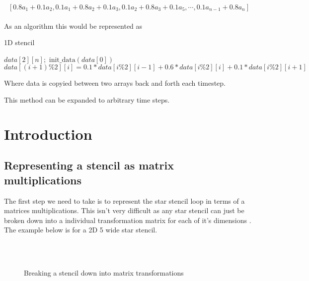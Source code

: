 \documentclass{article}
\begin{document}
\[ [0.8 a_1 + 0.1 a_2 , 0.1 a_1 + 0.8 a_2+ 0.1 a_3, 0.1 a_2 + 0.8 a_3 + 0.1a_5,\cdots,0.1a_{n-1}+0.8a_n]\] \\

As an algorithm this would be represented as 

\begin{algorithm}[H]
	\caption{1D stencil}\label{euclid}
	\begin{algorithmic}[1]
	\State $\textit{data}[2][n];$
	\State $\text{init\_data}(\textit{data}[0])$ 
	\State $\textit{data}[(i+1)\%2][i] = 0.1*data[i\%2][i-1] + 0.6*data[i\%2][i] + 0.1*data[i\%2][i+1]$ 
	\EndFor \\
	\end{algorithmic}
\end{algorithm}

Where data is copyied between two arrays back and forth each timestep. 

This method can be expanded to arbitrary time steps.
 

\section{Introduction}

\subsection{Representing a stencil as matrix multiplications}

The first step we need to take is to represent the star stencil loop in terms of a matrices multiplications.
This isn't very difficult as any star stencil can just be broken down into a individual transformation matrix for each of it's dimensions \cite{10.1145/3524059.3532392}.
The example below is for a 2D 5 wide star stencil. \\

\begin{figure}[H]
	\begin{mdframed}[backgroundcolor=myFigureColour]
		 \\
		 \\
		
		\caption{Breaking a stencil down into matrix transformations}
	\end{mdframed}
\end{figure}
\end{document}
